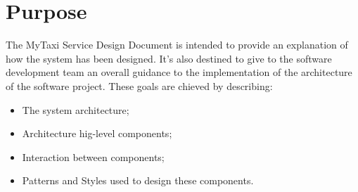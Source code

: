 \documentclass[../../../../dd.tex]{subfiles}
\begin{document}
	\section{Purpose}
		The MyTaxi Service Design Document is intended to provide an explanation of how the system has been designed. It's also destined to give to the software development team an overall guidance to the implementation of the architecture of the software project.
		These goals are chieved by describing:
		\begin{itemize}
			\item The system architecture;
			\item Architecture hig-level components;
			\item Interaction between components;
			\item Patterns and Styles used to design these components.
		\end{itemize}
		
\end{document}
